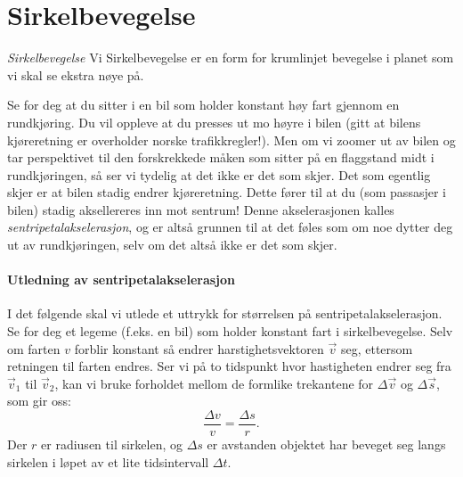 

\newpage

\section{Sirkelbevegelse}

\textit{Sirkelbevegelse} Vi Sirkelbevegelse er en form for krumlinjet bevegelse i planet som vi skal se ekstra nøye på. 

Se for deg at du sitter i en bil som holder konstant høy fart gjennom en rundkjøring. Du vil oppleve at du presses ut mo høyre i bilen (gitt at bilens kjøreretning er overholder norske trafikkregler!). Men om vi zoomer ut av bilen og tar perspektivet til den forskrekkede måken som sitter på en flaggstand midt i rundkjøringen, så ser vi tydelig at det ikke er det som skjer. Det som egentlig skjer er at bilen stadig endrer kjøreretning. Dette fører til at du (som passasjer i bilen) stadig aksellereres inn mot sentrum! Denne akselerasjonen kalles \textit{sentripetalakselerasjon}, og er altså grunnen til at det føles som om noe dytter deg ut av rundkjøringen, selv om det altså ikke er det som skjer.

\paragraph{Utledning av sentripetalakselerasjon} I det følgende skal vi utlede et uttrykk for størrelsen på sentripetalakselerasjon. 
Se for deg et legeme (f.eks. en bil) som holder konstant fart i sirkelbevegelse. Selv om farten \( v \) forblir konstant så endrer harstighetsvektoren \( \vec{v} \) seg, ettersom retningen til farten endres. Ser vi på to tidspunkt hvor hastigheten endrer seg fra \( \vec{v}_1 \) til \( \vec{v}_2 \), kan vi bruke forholdet mellom de formlike trekantene for \( \Delta \vec{v} \) og \( \Delta \vec{s} \), som gir oss:
    \[
    \frac{\Delta v}{v} = \frac{\Delta s}{r}.
    \]
    Der \( r \) er radiusen til sirkelen, og \( \Delta s \) er avstanden objektet har beveget seg langs sirkelen i løpet av et lite tidsintervall \( \Delta t \). 


